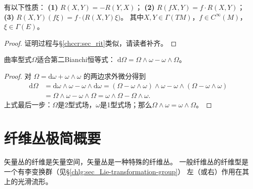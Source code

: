 \begin{theorem}\label{chfb:thm_RP}
    有以下性质：
    {\bfseries (1)} $R(X, Y)=-R(Y, X)$；
    {\bfseries (2)} $R(f X, Y)=f \cdot R(X, Y)$；
    {\bfseries (3)} $R(X, Y)(f \xi)=f \cdot\bigl(R(X, Y) \xi\bigr)$。
    其中$X, Y \in \Gamma(TM)$，$ f \in C^{\infty}(M)$，$ \xi \in \Gamma(E)$。
\end{theorem}
\begin{proof}
    证明过程与\S\ref{chccr:sec_rit}类似，请读者补齐。
\end{proof}


\begin{theorem}\label{chfb:thm_2ndBianchi}
    曲率型式$\Omega$适合第二Bianchi恒等式：
    $ \mathrm{d} \Omega = \Omega \wedge \omega - \omega \wedge \Omega $。
\end{theorem}
\begin{proof}
对 $\Omega=\mathrm{d} \omega + \omega \wedge \omega$ 的两边求外微分得到
\begin{align*}
    \mathrm{d} \Omega & =\mathrm{d} \omega \wedge \omega- \omega \wedge \mathrm{d} \omega 
     =(\Omega-\omega \wedge \omega) \wedge \omega-\omega \wedge(\Omega-\omega \wedge \omega) \\
    & =\Omega \wedge \omega-\omega \wedge \Omega =\omega \wedge \Omega-\Omega \wedge \omega  .
\end{align*}
上式最后一步：$\Omega$是2型式场，$\omega$是1型式场；那么$\Omega \wedge \omega=\omega \wedge \Omega$。
\end{proof}








\section{纤维丛极简概要}\label{chfb:sec_fb}
矢量丛的纤维是矢量空间，矢量丛是一种特殊的纤维丛。
一般纤维丛的纤维型是一个有李变换群（见\S\ref{chlg:sec_Lie-transformation-group}）
左（或右）作用在其上的光滑流形。

